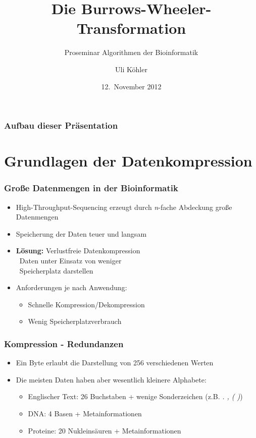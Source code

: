 \documentclass[14pt,xcolor=dvipsnames,pdftex]{beamer}
\title{Die Burrows-Wheeler-Transformation}
\subtitle{Proseminar \glqq Algorithmen der Bioinformatik\grqq}
\author{Uli Köhler}
\date{12.~November 2012}
\begin{document}
\frame{\titlepage}
\begin{frame}
\frametitle{Aufbau dieser Präsentation}
\tableofcontents
\end{frame}

\section{Grundlagen der Datenkompression}
\begin{frame}[allowframebreaks]
\frametitle{Große Datenmengen in der Bioinformatik}
  \begin{itemize}
   \item High-Throughput-Sequencing erzeugt durch \textit{n}-fache Abdeckung große Datenmengen
   \item Speicherung der Daten teuer und langsam
\end{itemize}
\framebreak
\begin{itemize}
 \item \textbf{Lösung:} Verlustfreie Datenkompression\\
 \textrightarrow\ Daten unter Einsatz von weniger\\
 \quad\ Speicherplatz darstellen
 \item Anforderungen je nach Anwendung:
 \begin{itemize}
  \item Schnelle Kompression/Dekompression
  \item Wenig Speicherplatzverbrauch
 \end{itemize}
\end{itemize}
\end{frame}
\begin{frame}[allowframebreaks]
 \frametitle{Kompression - Redundanzen}
 \begin{itemize}
  \item Ein Byte erlaubt die Darstellung von 256 verschiedenen Werten
  \item Die meisten Daten haben aber wesentlich kleinere Alphabete:
  \begin{itemize}
   \item Englischer Text: 26 Buchstaben + wenige Sonderzeichen (z.B. \textit{. , ( )})
   \item DNA: 4 Basen + Metainformationen
   \item Proteine: 20 Nukleinsäuren + Metainformationen
  \end{itemize}
 \end{itemize}
\end{frame}
\end{document}
